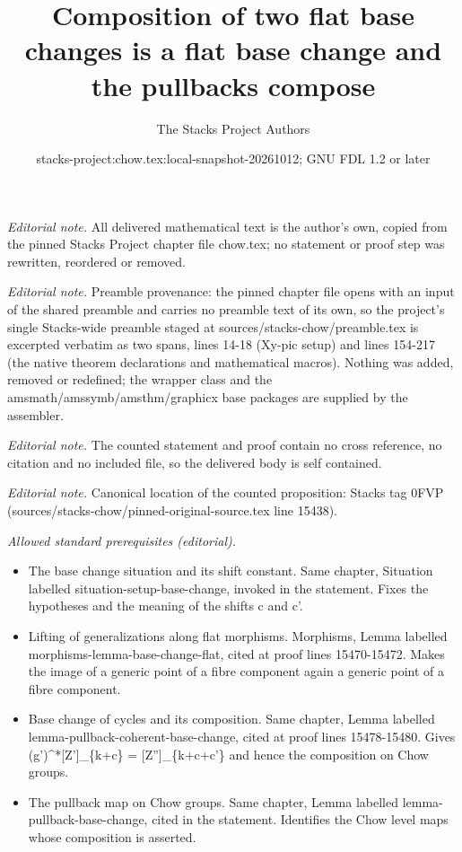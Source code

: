 \documentclass[10pt,a4paper]{amsart}
\title{Composition of two flat base changes is a flat base change and the pullbacks compose}
\author{The Stacks Project Authors}
\date{stacks-project:chow.tex:local-snapshot-20261012; GNU FDL 1.2 or later}
\theoremstyle{plain}
\theoremstyle{definition}
\theoremstyle{remark}
\numberwithin{equation}{subsection}
\begin{document}
\maketitle
\noindent\textit{Editorial note.} All delivered mathematical text is the author's own, copied from the pinned Stacks Project chapter file chow.tex; no statement or proof step was rewritten, reordered or removed.\par\medskip
\noindent\textit{Editorial note.} Preamble provenance: the pinned chapter file opens with an input of the shared preamble and carries no preamble text of its own, so the project's single Stacks-wide preamble staged at sources/stacks-chow/preamble.tex is excerpted verbatim as two spans, lines 14-18 (Xy-pic setup) and lines 154-217 (the native theorem declarations and mathematical macros). Nothing was added, removed or redefined; the wrapper class and the amsmath/amssymb/amsthm/graphicx base packages are supplied by the assembler.\par\medskip
\noindent\textit{Editorial note.} The counted statement and proof contain no cross reference, no citation and no included file, so the delivered body is self contained.\par\medskip
\noindent\textit{Editorial note.} Canonical location of the counted proposition: Stacks tag 0FVP (sources/stacks-chow/pinned-original-source.tex line 15438).\par\medskip
\noindent\textit{Allowed standard prerequisites (editorial).}\begin{itemize}
\item The base change situation and its shift constant. Same chapter, Situation labelled situation-setup-base-change, invoked in the statement. Fixes the hypotheses and the meaning of the shifts c and c'.
\item Lifting of generalizations along flat morphisms. Morphisms, Lemma labelled morphisms-lemma-base-change-flat, cited at proof lines 15470-15472. Makes the image of a generic point of a fibre component again a generic point of a fibre component.
\item Base change of cycles and its composition. Same chapter, Lemma labelled lemma-pullback-coherent-base-change, cited at proof lines 15478-15480. Gives (g')\textasciicircum{}*[Z']\_\{k+c\} = [Z'']\_\{k+c+c'\} and hence the composition on Chow groups.
\item The pullback map on Chow groups. Same chapter, Lemma labelled lemma-pullback-base-change, cited in the statement. Identifies the Chow level maps whose composition is asserted.
\end{itemize}\medskip
\end{document}
